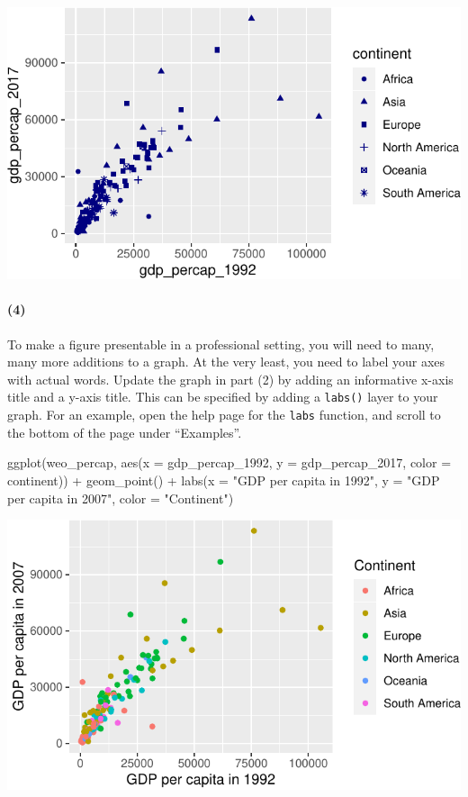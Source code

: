 \documentclass[11pt]{article}
\newenvironment{Shaded}{\begin{snugshade}}{\end{snugshade}}
\newcommand{\AttributeTok}[1]{\textcolor[rgb]{0.77,0.63,0.00}{#1}}
\newcommand{\FunctionTok}[1]{\textcolor[rgb]{0.00,0.00,0.00}{#1}}
\newcommand{\NormalTok}[1]{#1}
\newcommand{\SpecialCharTok}[1]{\textcolor[rgb]{0.00,0.00,0.00}{#1}}
\newcommand{\StringTok}[1]{\textcolor[rgb]{0.31,0.60,0.02}{#1}}
\begin{document}
\includegraphics{pre-assignment_files/figure-latex/unnamed-chunk-9-1.pdf}

\paragraph{(4)}

To make a figure presentable in a professional setting, you will need to
many, many more additions to a graph. At the very least, you need to
label your axes with actual words. Update the graph in part (2) by
adding an informative x-axis title and a y-axis title. This can be
specified by adding a \texttt{labs()} layer to your graph. For an
example, open the help page for the \texttt{labs} function, and scroll
to the bottom of the page under ``Examples''.

\begin{Shaded}
\begin{Highlighting}[]
\FunctionTok{ggplot}\NormalTok{(weo\_percap, }\FunctionTok{aes}\NormalTok{(}\AttributeTok{x =}\NormalTok{ gdp\_percap\_1992, }
                       \AttributeTok{y =}\NormalTok{ gdp\_percap\_2017, }
                       \AttributeTok{color =}\NormalTok{ continent)) }\SpecialCharTok{+}
  \FunctionTok{geom\_point}\NormalTok{() }\SpecialCharTok{+}
  \FunctionTok{labs}\NormalTok{(}\AttributeTok{x =} \StringTok{"GDP per capita in 1992"}\NormalTok{,}
       \AttributeTok{y =} \StringTok{"GDP per capita in 2007"}\NormalTok{,}
       \AttributeTok{color =} \StringTok{"Continent"}\NormalTok{)}
\end{Highlighting}
\end{Shaded}

\includegraphics{pre-assignment_files/figure-latex/unnamed-chunk-10-1.pdf}
\end{document}
